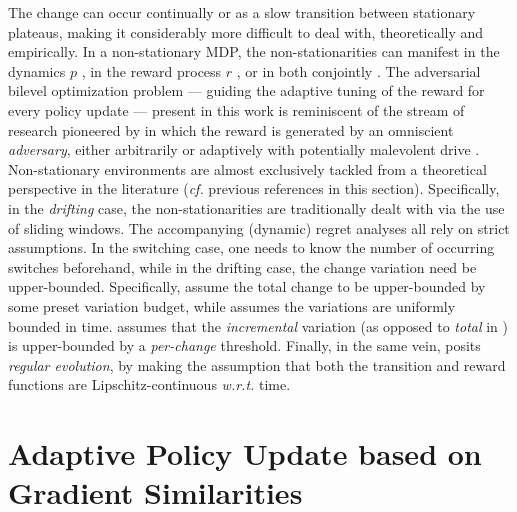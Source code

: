 The change can occur continually or as a slow transition between stationary plateaus,
making it considerably more difficult to deal with, theoretically and empirically.
In a non-stationary MDP,
the non-stationarities can manifest in the dynamics $p$
\cite{Nilim2005-rq,Da_Silva2006-gj,Xu2007-iq,Lim2013-ml,Abdallah2016-pd},
in the reward process $r$
\cite{Even-dar2005-rg,Dick2014-br},
or in both conjointly \cite{Yu2009-xp,Yu2009-yo,Abbasi-Yadkori2013-vd,Gajane2018-ee,
Padakandla2019-mb,Yu2019-sc,Lecarpentier2019-av}.
The adversarial bilevel optimization problem
--- guiding the adaptive tuning of the reward
for every policy update ---
present in this work
is reminiscent of the stream of research pioneered by \cite{Auer1995-mm}
in which the reward is generated by an omniscient \emph{adversary},
either arbitrarily or adaptively with potentially malevolent drive
\cite{Yu2009-xp,Yu2009-yo,Lim2013-ml,Gajane2018-ee,Yu2019-sc}.
Non-stationary environments are almost exclusively tackled from a theoretical perspective
in the literature (\textit{cf.} previous references in this section).
Specifically, in the \emph{drifting} case, the non-stationarities are traditionally dealt with
via the use of sliding windows.
The accompanying (dynamic) regret analyses all rely on strict assumptions.
In the switching case, one needs to know the number of occurring switches beforehand,
while in the drifting case, the change variation need be upper-bounded.
Specifically, \cite{Besbes2014-hm,Cheung2019-yq} assume the total change to be
upper-bounded by some preset variation budget,
while \cite{Cheung2019-cu} assumes the variations are uniformly bounded in time.
\cite{Ortner2019-pw} assumes that the \textit{incremental}
variation (as opposed to \textit{total} in \cite{Besbes2014-hm,Cheung2019-yq}) is upper-bounded
by a \textit{per-change} threshold.
Finally, in the same vein, \cite{Lecarpentier2019-av} posits \emph{regular evolution},
by making the assumption that both the transition and reward functions are Lipschitz-continuous
\textit{w.r.t.} time.

\section{Adaptive Policy Update based on Gradient Similarities}
\label{cossim}


